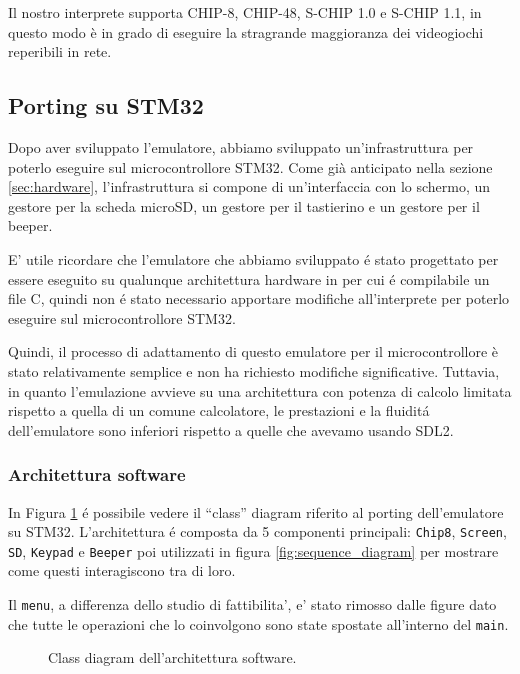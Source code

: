 \documentclass[a4paper]{article}
\begin{document}
Il nostro interprete supporta CHIP-8, CHIP-48, S-CHIP 1.0 e
S-CHIP 1.1, in questo modo è in grado di eseguire la stragrande
maggioranza dei videogiochi reperibili in rete.

\subsection{Porting su STM32}

Dopo aver sviluppato l'emulatore, abbiamo sviluppato un'infrastruttura per poterlo eseguire sul microcontrollore STM32.
Come già anticipato nella sezione \ref{sec:hardware}, l'infrastruttura si compone di un'interfaccia con lo schermo, un gestore per la scheda microSD, un gestore per il tastierino e un gestore per il beeper.

E' utile ricordare che l'emulatore che abbiamo sviluppato é stato progettato per essere eseguito su qualunque architettura hardware in per cui é compilabile un file C, quindi non é stato necessario apportare modifiche all'interprete per poterlo eseguire sul microcontrollore STM32.

Quindi, il processo di adattamento di questo emulatore per il microcontrollore è stato relativamente semplice e non ha richiesto modifiche significative. Tuttavia, in quanto l'emulazione avvieve su una architettura con potenza di calcolo limitata rispetto a quella di un comune calcolatore, le prestazioni e la fluiditá dell'emulatore sono inferiori rispetto a quelle che avevamo usando SDL2.


\subsubsection{Architettura software}

In Figura \ref{fig:class_diagram} é possibile vedere il ``class'' diagram riferito al porting dell'emulatore su STM32. L'architettura é composta da 5 componenti principali: \texttt{Chip8}, \texttt{Screen}, \texttt{SD}, \texttt{Keypad} e \texttt{Beeper} poi utilizzati in figura \ref{fig:sequence_diagram} per mostrare come questi interagiscono tra di loro.

Il \texttt{menu}, a differenza dello studio di fattibilita', e' stato rimosso dalle figure dato che tutte le operazioni che lo coinvolgono sono state spostate all'interno del \texttt{main}.

\begin{figure}[h!t]
    \begin{center}
        \begin{tikzpicture}[scale=0.6, transform shape]
            
        \end{tikzpicture}
    \end{center}
    \caption{
        Class diagram dell'architettura software.
    }
    \label{fig:class_diagram}
\end{figure}
\end{document}
